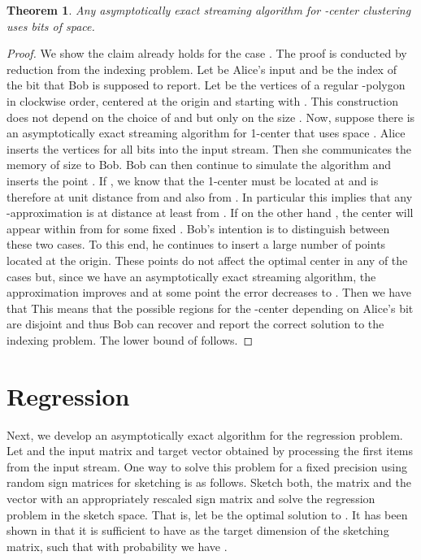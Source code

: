 \documentclass[a4paper,11pt,oneside,english,onecolumn]{article}
\newtheorem{theorem}{Theorem}
\theoremstyle{definition}
\begin{document}
\begin{theorem}
\label{lower:kcenter}
Any asymptotically exact streaming algorithm for -center clustering uses  bits of space.
\end{theorem}
\begin{proof}
We show the claim already holds for the case . 
The proof is conducted by reduction from the indexing problem. Let  be Alice's input and  be the index of the bit that Bob is supposed to report. Let  be the vertices of a regular -polygon in clockwise order, centered at the origin and starting with . This construction does not depend on the choice of  and  but only on the size . Now, suppose there is an asymptotically exact streaming algorithm for 1-center that uses space . Alice inserts the vertices  for all bits  into the input stream. Then she communicates the memory of size  to Bob. Bob can then continue to simulate the algorithm and inserts the point . If , we know that the 1-center must be located at  and is therefore at unit distance from  and also from . In particular this implies that any -approximation is at distance at least  from . If on the other hand , the center will appear within  from  for some fixed . Bob's intention is to distinguish between these two cases. To this end, he 
 continues to insert a large number of points located at the origin. These points do not affect the optimal center in any of the cases but, since we have an asymptotically exact streaming algorithm, the approximation improves and at some point the error decreases to . Then we have that  This means that the possible regions for the -center depending on Alice's bit are disjoint and thus Bob can recover and report the correct solution to the indexing problem. The lower bound of  follows.
\end{proof}

\section{Regression}
\label{section:Regression}

Next, we develop an asymptotically exact algorithm for the regression problem. Let  and  the input matrix and target vector obtained by processing the first  items from the input stream. One way to solve this problem for a fixed precision using random sign matrices for sketching is as follows. Sketch both, the matrix  and the vector  with an appropriately rescaled sign matrix  and solve the regression problem in the sketch space. That is, let  be the optimal solution to . It has been shown in \cite{LinAlgStream} that it is sufficient to have  as the target dimension of the sketching matrix, such that with probability  we have .
\end{document}
